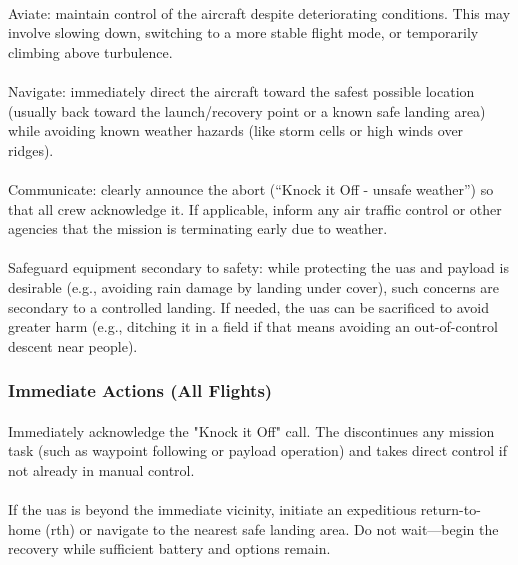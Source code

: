                 \paragraph{}Aviate: maintain control of the aircraft despite deteriorating conditions. This may involve slowing down, switching to a more stable flight mode, or temporarily climbing above turbulence.
                \paragraph{}Navigate: immediately direct the aircraft toward the safest possible location (usually back toward the launch/recovery point or a known safe landing area) while avoiding known weather hazards (like storm cells or high winds over ridges).
                \paragraph{}Communicate: clearly announce the abort (“Knock it Off - unsafe weather”) so that all crew acknowledge it. If applicable, inform any air traffic control or other agencies that the mission is terminating early due to weather.
                \paragraph{}Safeguard equipment secondary to safety: while protecting the \ac{uas} and payload is desirable (e.g., avoiding rain damage by landing under cover), such concerns are secondary to a controlled landing. If needed, the \ac{uas} can be sacrificed to avoid greater harm (e.g., ditching it in a field if that means avoiding an out-of-control descent near people).
            
            \subsubsection{Immediate Actions (All Flights)}
                \paragraph{} Immediately acknowledge the "Knock it Off" call. The  discontinues any mission task (such as waypoint following or payload operation) and takes direct control if not already in manual control.
                \paragraph{} If the \ac{uas} is beyond the immediate vicinity, initiate an expeditious return-to-home (\ac{rth}) or navigate to the nearest safe landing area. Do not wait—begin the recovery while sufficient battery and options remain.

